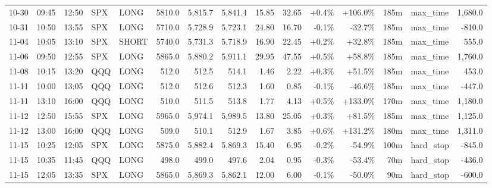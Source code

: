 \documentclass[11pt,a4paper,twoside]{article}
\begin{document}
\begin{landscape}
\begin{center}
\begin{longtable}{>{\color{txtmain}}l l l l l r r r r r r r r >{\color{txtmain}}l r}
10-30 & 09:45 & 12:50 & SPX & LONG & 5810.0 & 5,815.7 & 5,841.4 & 15.85 & 32.65 & \textcolor{wingreen}{+0.4\%} & \textcolor{wingreen}{+106.0\%} & 185m & max\_time & \textcolor{wingreen}{1,680.0} \\
10-31 & 10:50 & 13:55 & SPX & LONG & 5710.0 & 5,728.9 & 5,723.1 & 24.80 & 16.70 & \textcolor{lossred}{-0.1\%} & \textcolor{lossred}{-32.7\%} & 185m & max\_time & \textcolor{lossred}{-810.0} \\
11-04 & 10:05 & 13:10 & SPX & SHORT & 5740.0 & 5,731.3 & 5,718.9 & 16.90 & 22.45 & \textcolor{wingreen}{+0.2\%} & \textcolor{wingreen}{+32.8\%} & 185m & max\_time & \textcolor{wingreen}{555.0} \\
11-06 & 09:50 & 12:55 & SPX & LONG & 5865.0 & 5,880.2 & 5,911.1 & 29.95 & 47.55 & \textcolor{wingreen}{+0.5\%} & \textcolor{wingreen}{+58.8\%} & 185m & max\_time & \textcolor{wingreen}{1,760.0} \\
11-08 & 10:15 & 13:20 & QQQ & LONG & 512.0 & 512.5 & 514.1 & 1.46 & 2.22 & \textcolor{wingreen}{+0.3\%} & \textcolor{wingreen}{+51.5\%} & 185m & max\_time & \textcolor{wingreen}{453.0} \\
11-11 & 10:00 & 13:05 & QQQ & LONG & 512.0 & 512.6 & 512.3 & 1.60 & 0.85 & \textcolor{lossred}{-0.1\%} & \textcolor{lossred}{-46.6\%} & 185m & max\_time & \textcolor{lossred}{-447.0} \\
11-11 & 13:10 & 16:00 & QQQ & LONG & 510.0 & 511.5 & 513.8 & 1.77 & 4.13 & \textcolor{wingreen}{+0.5\%} & \textcolor{wingreen}{+133.0\%} & 170m & max\_time & \textcolor{wingreen}{1,180.0} \\
11-12 & 12:50 & 15:55 & SPX & LONG & 5965.0 & 5,974.1 & 5,989.5 & 13.80 & 25.05 & \textcolor{wingreen}{+0.3\%} & \textcolor{wingreen}{+81.5\%} & 185m & max\_time & \textcolor{wingreen}{1,125.0} \\
11-12 & 13:00 & 16:00 & QQQ & LONG & 509.0 & 510.1 & 512.9 & 1.67 & 3.85 & \textcolor{wingreen}{+0.6\%} & \textcolor{wingreen}{+131.2\%} & 180m & max\_time & \textcolor{wingreen}{1,311.0} \\
11-15 & 10:25 & 12:05 & SPX & LONG & 5875.0 & 5,882.4 & 5,869.3 & 15.40 & 6.95 & \textcolor{lossred}{-0.2\%} & \textcolor{lossred}{-54.9\%} & 100m & hard\_stop & \textcolor{lossred}{-845.0} \\
11-15 & 10:35 & 11:45 & QQQ & LONG & 498.0 & 499.0 & 497.6 & 2.04 & 0.95 & \textcolor{lossred}{-0.3\%} & \textcolor{lossred}{-53.4\%} & 70m & hard\_stop & \textcolor{lossred}{-436.0} \\
11-15 & 12:05 & 13:35 & SPX & LONG & 5865.0 & 5,869.3 & 5,862.1 & 12.00 & 6.00 & \textcolor{lossred}{-0.1\%} & \textcolor{lossred}{-50.0\%} & 90m & hard\_stop & \textcolor{lossred}{-600.0} \\

\end{longtable}
\end{center}
\end{landscape}
\end{document}
